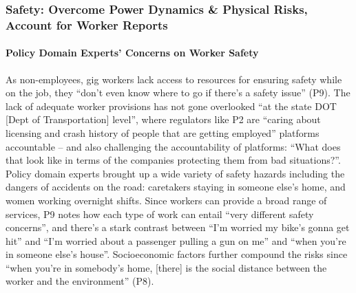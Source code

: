 \subsubsection{Safety{: Overcome Power Dynamics \& Physical Risks, Account for Worker Reports}}\label{safety}
\paragraph{{Policy Domain Experts' Concerns on Worker Safety}}
As non-employees, {gig} workers lack access to resources for ensuring safety while on the job{, } they ``don't even know where to go if there's a safety issue'' (P9). The lack of adequate worker provisions has not gone overlooked ``at the state DOT [Dept of Transportation] level'', where regulators like P2 are ``caring about licensing and crash history of people that are getting employed''  platforms {accountable} – {and also challenging the accountability of platforms: }``What does that look like in terms of the companies protecting them from bad situations?''. {Policy domain experts} brought up {a wide variety of safety hazards} {including} the dangers of accidents on the road: caretakers staying in someone else's home, and women working overnight shifts. Since workers can provide a broad range of services, P9 notes how each type of work can entail ``very different safety concerns'', and there's a stark contrast between ``I'm worried my bike's gonna get hit'' and ``I'm worried about a passenger pulling a gun on me'' and ``when you're in someone else's house''. Socioeconomic factors further compound the risks since ``when you're in somebody's home, [there] is the social distance between the worker and the environment'' (P8). 

